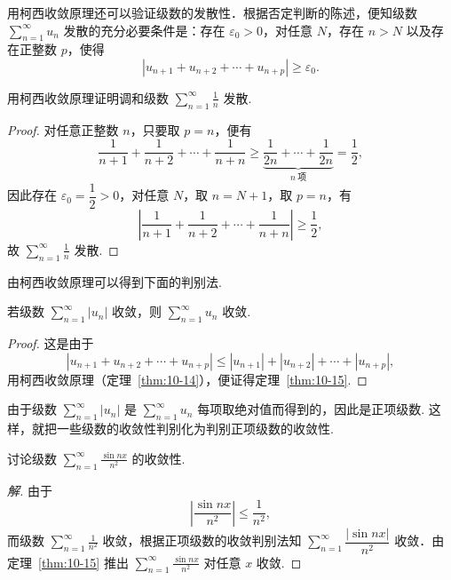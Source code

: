 用柯西收敛原理还可以验证级数的发散性．根据否定判断的陈述，便知级数 $\sum_{n=1}^{\infty}u_{n}$ 发散的充分必要条件是：存在 $\varepsilon_{0}>0$，对任意 $N$，存在 $n>N$ 以及存在正整数 $p$，使得
\[
|u_{n+1}+u_{n+2}+\cdots+u_{n+p}|\geqslant\varepsilon_{0}.
\]

\begin{example}\label{ex:10-4-2-1}
用柯西收敛原理证明调和级数 $\displaystyle\sum_{n=1}^{\infty}\frac{1}{n}$ 发散.
\end{example}

\begin{proof}
对任意正整数 $n$，只要取 $p=n$，便有
\[
\frac{1}{n+1}+\frac{1}{n+2}+\cdots+\frac{1}{n+n}\geqslant\underbrace{\frac{1}{2n}+\cdots+\frac{1}{2n}}_{n\ \text{项}}=\frac{1}{2},
\]
因此存在 $\varepsilon_{0}=\dfrac{1}{2}>0$，对任意 $N$，取 $n=N+1$，取 $p=n$，有
\[
\left|\frac{1}{n+1}+\frac{1}{n+2}+\cdots+\frac{1}{n+n}\right|\geqslant\frac{1}{2},
\]
故 $\displaystyle\sum_{n=1}^{\infty}\frac{1}{n}$ 发散.
\end{proof}

由柯西收敛原理可以得到下面的判别法.

\begin{theorem}\label{thm:10-15}
若级数 $\sum_{n=1}^{\infty}|u_{n}|$ 收敛，则 $\sum_{n=1}^{\infty}u_{n}$ 收敛.
\end{theorem}

\begin{proof}
这是由于
\[
|u_{n+1}+u_{n+2}+\cdots+u_{n+p}|\leqslant|u_{n+1}|+|u_{n+2}|+\cdots+|u_{n+p}|,
\]
用柯西收敛原理（定理~\ref{thm:10-14}），便证得定理~\ref{thm:10-15}.
\end{proof}

由于级数 $\sum_{n=1}^{\infty}|u_{n}|$ 是 $\sum_{n=1}^{\infty}u_{n}$ 每项取绝对值而得到的，因此是正项级数. 这样，就把一些级数的收敛性判别化为判别正项级数的收敛性.

\begin{example}\label{ex:10-4-2-2}
讨论级数 $\displaystyle\sum_{n=1}^{\infty}\frac{\sin nx}{n^{2}}$ 的收敛性.
\end{example}

\begin{proof}[解]
由于
\[
\left|\frac{\sin nx}{n^{2}}\right|\leqslant\frac{1}{n^{2}},
\]
而级数 $\displaystyle\sum_{n=1}^{\infty}\frac{1}{n^{2}}$ 收敛，根据正项级数的收敛判别法知 $\sum_{n=1}^{\infty}\dfrac{|\sin nx|}{n^{2}}$ 收敛．由定理~\ref{thm:10-15} 推出 $\displaystyle\sum_{n=1}^{\infty}\frac{\sin nx}{n^{2}}$ 对任意 $x$ 收敛.
\end{proof}

